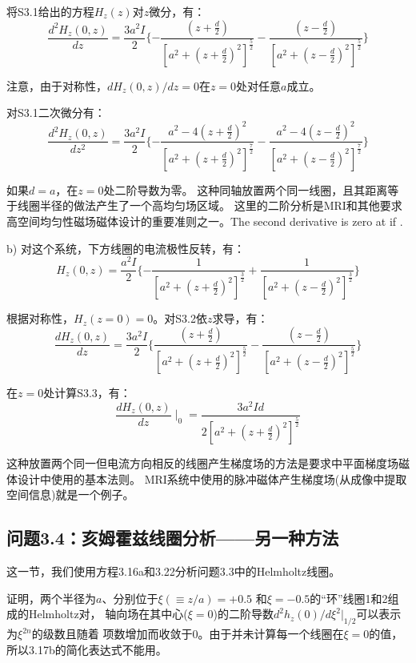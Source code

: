将S3.1给出的方程$H_z(z)$对$z$微分，有：
\begin{equation}
\frac{d^2H_z(0,z)}{dz}=\frac{3a^2I}{2}\{{-\frac{(z+\frac{d}{2})}{[a^2+(z+\frac{d}{2})^2]^\frac{5}{2}}-\frac{(z-\frac{d}{2})}{[a^2+(z-\frac{d}{2})^2]^\frac{5}{2}}}\}
\end{equation}

注意，由于对称性，$dH_z(0,z)/dz=0$在$z=0$处对任意$a$成立。

对S3.1二次微分有：
\begin{equation}
\frac{d^2H_z(0,z)}{dz^2}=\frac{3a^2I}{2}\{{-\frac{a^2-4(z+\frac{d}{2})^2}{[a^2+(z+\frac{d}{2})^2]^\frac{7}{2}}}
-\frac{a^2-4(z-\frac{d}{2})^2}{[a^2+(z-\frac{d}{2})^2]^\frac{7}{2}}\}
\end{equation}

如果$d = a$，在$z = 0$处二阶导数为零。
这种同轴放置两个同一线圈，且其距离等于线圈半径的做法产生了一个高均匀场区域。
这里的二阶分析是MRI和其他要求高空间均匀性磁场磁体设计的重要准则之一。The second derivative is zero at  if . 

b) 对这个系统，下方线圈的电流极性反转，有：
\begin{equation}%
H_z(0,z)=\frac{a^2I}{2}\{{-\frac{1}{[a^2+(z+\frac{d}{2})^2]^\frac{3}{2}}+\frac{1}{[a^2+(z-\frac{d}{2})^2]^\frac{3}{2}}}\}
\end{equation}

根据对称性，$H_z(z=0)=0$。对S3.2依$z$求导，有：
\begin{equation}%
\frac{dH_z(0,z)}{dz}=\frac{3a^2I}{2}\{{\frac{(z+\frac{d}{2})}{[a^2+(z+\frac{d}{2})^2]^\frac{5}{2}}-\frac{(z-\frac{d}{2})}{[a^2+(z-\frac{d}{2})^2]^\frac{5}{2}}}\}
\end{equation}

在$z=0$处计算S3.3，有：
\begin{equation}
\frac{dH_z(0,z)}{dz}\mid_0=\frac{3a^2Id}{2[a^2+(z+\frac{d}{2})^2]^\frac{5}{2}}
\end{equation}

这种放置两个同一但电流方向相反的线圈产生梯度场的方法是要求中平面梯度场磁体设计中使用的基本法则。
MRI系统中使用的脉冲磁体产生梯度场(从成像中提取空间信息)就是一个例子。
\newpage

\subsection{问题3.4：亥姆霍兹线圈分析——另一种方法}
这一节，我们使用方程3.16a和3.22分析问题3.3中的Helmholtz线圈。

证明，两个半径为$a$、分别位于$\xi(\equiv z/a)=+0.5$ 和$\xi=−0.5$的“环”线圈1和2组成的Helmholtz对，
轴向场在其中心($\xi=0$)的二阶导数$d^2 h_z(0)/d\xi^2|_{1/2}$可以表示为$\xi^{2n}$的级数且随着
项数增加而收敛于0。由于并未计算每一个线圈在$\xi=0$的值，所以3.17b的简化表达式不能用。



